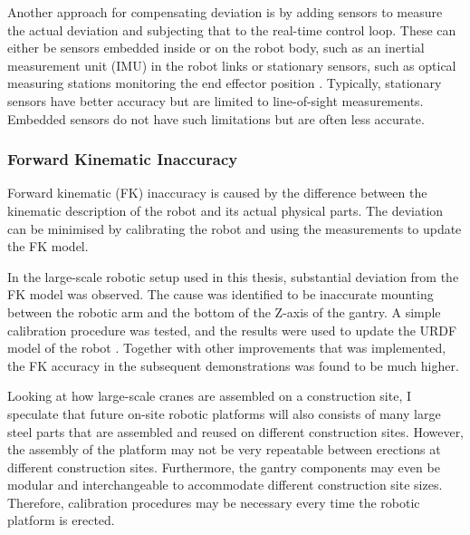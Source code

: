Another approach for compensating deviation is by adding sensors to measure the actual deviation and subjecting that to the real-time control loop. These can either be sensors embedded inside or on the robot body, such as an inertial measurement unit (IMU) in the robot links \parencite{judHEAPAutonomousWalking2021} or stationary sensors, such as optical measuring stations monitoring the end effector position \parencite{stadelmannEndEffectorPoseCorrection2019}. Typically, stationary sensors have better accuracy but are limited to line-of-sight measurements. Embedded sensors do not have such limitations but are often less accurate.

\subsubsection{Forward Kinematic Inaccuracy}
\label{subsubsection:new-hypo-forward-kinematic-inaccuracy}

Forward kinematic (FK) inaccuracy is caused by the difference between the kinematic description of the robot and its actual physical parts. The deviation can be minimised by calibrating the robot \parencite{chen-gangReviewKinematicsCalibration2014, mooringFundamentalsManipulatorCalibration1991} and using the measurements to update the FK model.

In the large-scale robotic setup used in this thesis, substantial deviation from the FK model was observed. The cause was identified to be inaccurate mounting between the robotic arm and the bottom of the Z-axis of the gantry. A simple calibration procedure was tested, and the results were used to update the URDF model of the robot . Together with other improvements that was implemented, the FK accuracy in the subsequent demonstrations was found to be much higher.

Looking at how large-scale cranes are assembled on a construction site, I speculate that future on-site robotic platforms will also consists of many large steel parts that are assembled and reused on different construction sites. However, the assembly of the platform may not be very repeatable between erections at different construction sites. Furthermore, the gantry components may even be modular and interchangeable to accommodate different construction site sizes. Therefore, calibration procedures may be necessary every time the robotic platform is erected.
